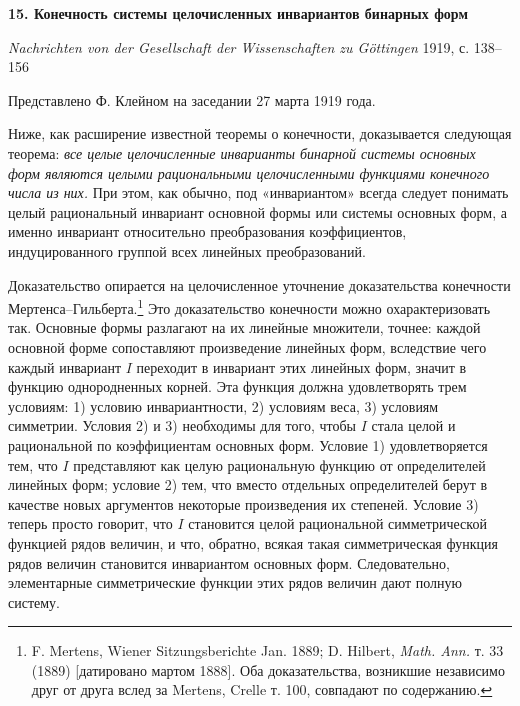\documentclass[11pt]{article}
\begin{document}

\begin{center}
{\Large\bfseries 15. Конечность системы целочисленных инвариантов бинарных форм\par}
\vspace{1em}
\emph{Nachrichten von der Gesellschaft der Wissenschaften zu Göttingen} 1919, с. 138--156
\end{center}

\vspace{2em}
\begin{center}
Представлено Ф. Клейном на заседании 27 марта 1919 года.
\end{center}

Ниже, как расширение известной теоремы о конечности, доказывается следующая теорема:
\emph{все целые целочисленные инварианты бинарной системы основных форм являются целыми рациональными целочисленными функциями конечного числа из них.}
При этом, как обычно, под «инвариантом» всегда следует понимать целый рациональный инвариант основной формы или системы основных форм, а именно инвариант относительно преобразования коэффициентов, индуцированного группой всех линейных преобразований.

Доказательство опирается на целочисленное уточнение доказательства конечности Мертенса--Гильберта.\footnote{F. Mertens, Wiener Sitzungsberichte Jan. 1889; D. Hilbert, \emph{Math. Ann.} т. 33 (1889) [датировано мартом 1888]. Оба доказательства, возникшие независимо друг от друга вслед за Mertens, Crelle т. 100, совпадают по содержанию.}
Это доказательство конечности можно охарактеризовать так. Основные формы разлагают на их линейные множители, точнее: каждой основной форме сопоставляют произведение линейных форм, вследствие чего каждый инвариант \(I\) переходит в инвариант этих линейных форм, значит в функцию однородненных корней. Эта функция должна удовлетворять трем условиям: 1) условию инвариантности, 2) условиям веса, 3) условиям симметрии. Условия 2) и 3) необходимы для того, чтобы \(I\) стала целой и рациональной по коэффициентам основных форм. Условие 1) удовлетворяется тем, что \(I\) представляют как целую рациональную функцию от определителей линейных форм; условие 2) тем, что вместо отдельных определителей берут в качестве новых аргументов некоторые произведения их степеней. Условие 3) теперь просто говорит, что \(I\) становится целой рациональной симметрической функцией рядов величин, и что, обратно, всякая такая симметрическая функция рядов величин становится инвариантом основных форм. Следовательно, элементарные симметрические функции этих рядов величин дают полную систему.
\end{document}

